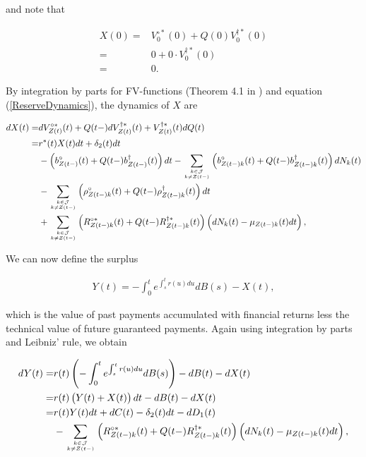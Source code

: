\documentclass{book}
\newcommand{\1}[1]{\mathbbm{1}_{\left\lbrace #1 \right\rbrace}}
\theoremstyle{break}
\theoremstyle{remark}
\numberwithin{equation}{section}
\begin{document}
and note that 

\begin{align*}
X(0) =& V_{0}^{\circ*}(0) + Q(0) V_{0}^{\dagger*}(0) \\
=& 0 + 0 \cdot V_{0}^{\dagger*}(0) \\
=& 0.
\end{align*}

By integration by parts for FV-functions (Theorem 4.1 in \cite{LivStok}) and equation (\ref{ReserveDynamics}), the dynamics of $X$ are

\begin{align} \label{XDynamics}
\begin{split}
dX(t) =& dV_{Z(t)}^{\circ*}(t) + Q(t-) dV_{Z(t)}^{\dagger*}(t) + V_{Z(t)}^{\dagger*}(t) dQ(t) \\
=& r^*(t) X(t) dt + \delta_2(t)dt \\
&- \left( b_{Z(t-)}^\circ(t) + Q(t-) b_{Z(t-)}^\dagger(t) \right) dt - \sum_{k \in \mathcal{J} \atop k \neq Z(t-)} \left( b_{Z(t-)k}^\circ(t) + Q(t-) b_{Z(t-)k}^\dagger(t)\right) dN_k(t) \\
&- \sum_{k \in \mathcal{J} \atop k \neq Z(t-)} \left( \rho_{Z(t-)k}^\circ(t) + Q(t-) \rho_{Z(t-)k}^\dagger(t) \right) dt \\
&+ \sum_{k \in \mathcal{J} \atop k \neq Z(t-)} \left( R_{Z(t-)k}^{\circ*}(t) + Q(t-) R_{Z(t-)k}^{\dagger*}(t) \right) \left( dN_k(t) - \mu_{Z(t-)k}(t) dt \right),
\end{split}
\end{align}

We can now define the surplus

\begin{align*}
Y(t) = - \int_0^t e^{\int_s^t r(u)du} dB(s) - X(t),
\end{align*}

which is the value of past payments accumulated with financial returns less the technical value of future guaranteed payments. Again using integration by parts and Leibniz' rule, we obtain

\begin{align} \label{YDynamics}
\begin{split}
	dY(t) =& r(t) \left( - \int_0^t e^{\int_s^t r(u) du} dB(s) \right) - dB(t) - dX(t) \\
	=& r(t) \left( Y(t) + X(t) \right)dt - dB(t) - dX(t) \\
	=& r(t) Y(t) dt + dC(t) - \delta_2(t)dt - dD_1(t) \\
	&- \sum_{k \in \mathcal{J} \atop k \neq Z(t-)} \left( R_{Z(t-)k}^{\circ*}(t) + Q(t-) R_{Z(t-)k}^{\dagger*}(t) \right) \left( dN_k(t) - \mu_{Z(t-)k}(t) dt \right),
\end{split}
\end{align}
\end{document}
